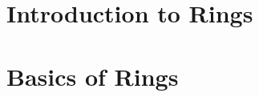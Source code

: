 
\usepackage{xr}

\newcommand{\version}{0.1}
\newcommand{\volumenumber}{2}
\newcommand{\volumename}{Rings}
\newcommand{\volumeimage}{cover/Integers.png}

\newcommand{\quotepagetext}{
    [Some] of the major discoveries in ring theory have helped shape the course of development of modern abstract algebra... A course in ring theory is an indispensable part of the education of any fledgling algebraist.
}
\newcommand{\quotepageattribution}{Tsit-Yuen Lam, 2001}
\newcommand{\quotepagecitation}{\cite{lam_2001}}

\newcommand{\prefacevolumetext}{
    This volume covers the basics of ring theory. %
}

\linespread{1.05}



\newcommand{\Mn}[2]{\mathcal{M}_{#1}(#2)}  %

\newcommand{\Q}{\mathbb{Q}}     %
\newcommand{\Z}{\mathbb{Z}}     %
\newcommand{\Zn}[1]{\mathbb{Z}_{#1}}  %


\frontmatterpages

\chapter{Introduction to Rings}

\chapter{Basics of Rings}
